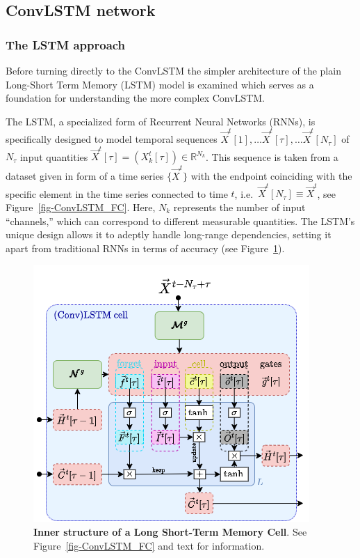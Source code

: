 \documentclass[
]{agujournal2019}
\begin{document}
\hypertarget{convlstm-network}{%
\subsection{ConvLSTM network}\label{convlstm-network}}

\hypertarget{sec-LSTM}{%
\subsubsection{The LSTM approach}\label{sec-LSTM}}

Before turning directly to the ConvLSTM the simpler architecture of the
plain Long-Short Term Memory (LSTM) model is examined which serves as a
foundation for understanding the more complex ConvLSTM.

The LSTM, a specialized form of Recurrent Neural Networks (RNNs), is
specifically designed to model temporal sequences
\(\vec{X}^t[1], \ldots \vec{X}^t[\tau],\ldots \vec{X}^t[N_\tau]\) of
\(N_\tau\) input quantities
\(\vec{X}^t[\tau] = (X^t_k[\tau]) \in \mathbb{R}^{N_k}\). This sequence
is taken from a dataset given in form of a time series \(\{\vec{X}^t\}\)
with the endpoint coinciding with the specific element in the time
series connected to time \(t\),
i.e.~\(\vec{X}^t[N_\tau] \equiv \vec{X}^t\), see
Figure~\ref{fig-ConvLSTM_FC}. Here, \(N_k\) represents the number of
input ``channels,'' which can correspond to different measurable
quantities. The LSTM's unique design allows it to adeptly handle
long-range dependencies, setting it apart from traditional RNNs in terms
of accuracy (see Figure~\ref{fig-lstm}).

\begin{figure}

{\centering \includegraphics{./LSTM.png}

}

\caption{\label{fig-lstm}\textbf{Inner structure of a Long Short-Term
Memory Cell}. See Figure~\ref{fig-ConvLSTM_FC} and text for
information.}

\end{figure}
\end{document}
